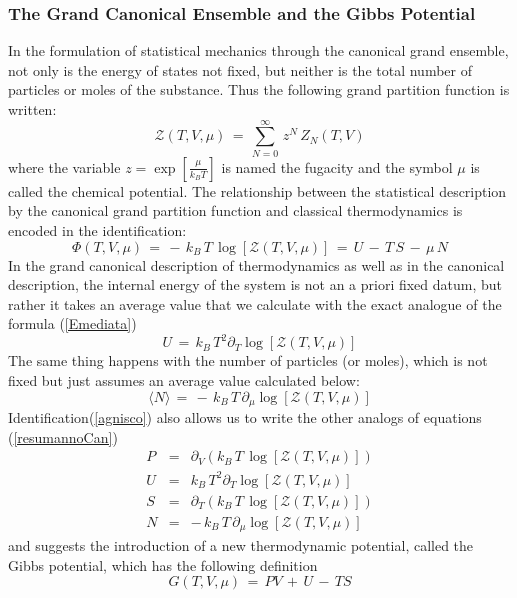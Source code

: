 \documentclass[10pt,a4paper]{article}
\begin{document}
\subsubsection{The Grand Canonical Ensemble and the Gibbs Potential}
\label{insiemegrande} In the formulation of statistical mechanics through the canonical grand ensemble, not only is the energy of states not fixed, but neither is the total number of particles or moles of the substance. Thus the following grand partition function is written:
\begin{equation}\label{grandecane}
    \mathcal{Z}\left(T,V,\mu\right) \, = \, \sum_{N=0}^{\infty}
    \,z^N \,
    Z_N\left(T,V\right)
\end{equation}
where the variable $z=\exp\left[\frac{\mu}{k_B T}\right]$ is named
the fugacity and the symbol  $\mu$ is called the chemical potential.
The relationship between the statistical description by the canonical grand partition function and classical thermodynamics is encoded in the identification:
\begin{equation}\label{agnisco}
    \Phi(T,V,\mu) \, = \,-\, k_B \,T\,
    \log\left[\mathcal{Z}\left(T,V,\mu\right)\right]\, = \, U \, -
    \, T\, S \, - \, \mu \, N
\end{equation}
In the grand canonical description of thermodynamics as well as in the canonical description, the internal energy of the system is not an a priori fixed datum, but rather it takes an average value that we calculate with the exact analogue of the formula (\ref{Emediata})
\begin{equation}\label{Ugrancan}
    U \, = \, k_B \, T^2 \partial_T \log \left[
    \mathcal{Z}\left(T,V,\mu\right)\right]
\end{equation}
The same thing happens with the number of particles (or moles), which is not fixed but just assumes an average value calculated below:
\begin{equation}\label{Nmediano}
    \langle N \rangle \, = \, - \, k_B \, T \, \partial_\mu  \log \left[
    \mathcal{Z}\left(T,V,\mu\right)\right]
\end{equation}
Identification(\ref{agnisco}) also allows us to write the other analogs of equations (\ref{resumannoCan})
\begin{eqnarray}
\label{rastrellato}
  P &=& \partial_V \left(k_B \, T \, \log \left[\mathcal{Z}\left(T,V,\mu\right)\right]\right) \nonumber \\
  U &=& k_B \, T^2 \partial_T \log \left[
    \mathcal{Z}\left(T,V,\mu\right)\right]\nonumber \\
  S &=& \partial_T \left(k_B \, T \, \log \left[\mathcal{Z}\left(T,V,\mu\right)\right] \right)\nonumber\\
  N &=&  - \, k_B \, T \, \partial_\mu  \log \left[
    \mathcal{Z}\left(T,V,\mu\right)\right]
\end{eqnarray}
and suggests the introduction of a new thermodynamic potential, called the Gibbs potential, which has the following definition
\begin{equation}\label{gibbone}
    G(T,V,\mu) \, = \, PV \, + \, U \, - \, TS
\end{equation}
\end{document}
